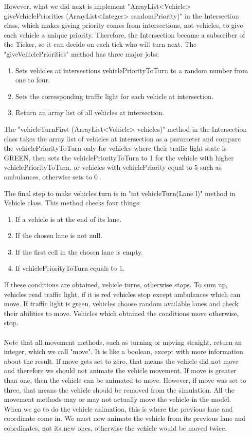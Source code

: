 \documentclass[a4paper,11pt,titlepage]{article}
\begin{document}
However, what we did next is implement "ArrayList<Vehicle> giveVehiclePriorities (ArrayList<Integer> randomPriority)" in the Intersection class, which makes giving priority comes from intersections, not vehicles, to give each vehicle a unique priority. Therefore, the Intersection became a subscriber of the Ticker, so it can decide on each tick who will turn next. The "giveVehiclePriorities" method has three major jobs:
\begin{enumerate}\itemsep1pt \parskip0pt 
\item Sets vehicles at intersections vehiclePriorityToTurn to a random number from one to four.
\item Sets the corresponding traffic light for each vehicle at intersection.
\item Return an array list of all vehicles at intersection.
\end{enumerate}
The "vehicleTurnFirst (ArrayList<Vehicle> vehicles)" method in the Intersection class takes the array list of vehicles at intersection as a parameter and compare the vehiclePriorityToTurn only for vehicles where their traffic light state is GREEN, then sets the vehiclePriorityToTurn to 1 for the  vehicle with higher vehiclePriorityToTurn, or vehicles with vehiclePriority equal to 5 such as ambulances, otherwise sets to 0 .

The final step to make vehicles turn is in "int vehicleTurn(Lane l)" method in Vehicle class. This method checks four things:
\begin{enumerate}\itemsep1pt \parskip0pt 
\item If a vehicle is at the end of its lane.
\item If the chosen lane is not null.
\item If the first cell in the chosen lane is empty.
\item If vehiclePriorityToTurn equals to 1.
\end{enumerate}
If these conditions are obtained, vehicle turns, otherwise stops.
To sum up, vehicles read traffic light, if it is red vehicles stop except ambulances which can move. If traffic light is green, vehicles choose random available lanes and check their abilities to move. Vehicles which obtained the conditions move otherwise, stop.

\paragraph{}
Note that all movement methods, such as turning or moving straight, return an integer, which we call "move". It is like a boolean, except with more information about the result. If move gets set to zero, that means the vehicle did not move and therefore we should not animate the vehicle movement. If move is greater than one, then the vehicle can be animated to move. However, if move was set to three, that means the vehicle should be removed from the simulation. All the movement methods may or may not actually move the vehicle in the model. When we go to do the vehicle animation, this is where the previous lane and coordinate come in. We must now animate the vehicle from its previous lane and coordinates, not its new ones, otherwise the vehicle would be moved twice. 
\end{document}
